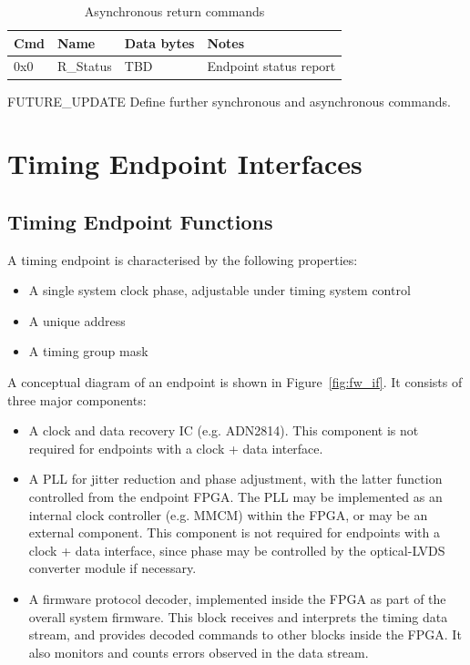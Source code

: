 \documentclass[a4paper,11pt]{article}
\begin{document}
\begin{table}[h!]
  \centering
  \begin{tabular}{@{}lllp{9cm}@{}} \toprule
    Cmd & Name & Data bytes & Notes\\ \midrule
    0x0 & R\_Status & TBD & Endpoint status report \\ \bottomrule
  \end{tabular}
  \caption{Asynchronous return commands}
  \label{tab:async_ret_cmds}
\end{table}

{\color{red}FUTURE\_UPDATE} Define further synchronous and asynchronous commands.

\section{Timing Endpoint Interfaces}

\subsection{Timing Endpoint Functions}

A timing endpoint is characterised by the following properties:

\begin{itemize}
	\item A single system clock phase, adjustable under timing system control
	\item A unique address
	\item A timing group mask
\end{itemize}

A conceptual diagram of an endpoint is shown in Figure~\ref{fig:fw_if}. It consists of three major components:

\begin{itemize}
	\item A clock and data recovery IC (e.g. ADN2814). This component is not required for endpoints with a clock + data interface.
	\item A PLL for jitter reduction and phase adjustment, with the latter function controlled from the endpoint FPGA. The PLL may be implemented as an internal clock controller (e.g. MMCM) within the FPGA, or may be an external component. This component is not required for endpoints with a clock + data interface, since phase may be controlled by the optical-LVDS converter module if necessary.
	\item A firmware protocol decoder, implemented inside the FPGA as part of the overall system firmware. This block receives and interprets the timing data stream, and provides decoded commands to other blocks inside the FPGA. It also monitors and counts errors observed in the data stream.
\end{itemize}
\end{document}

